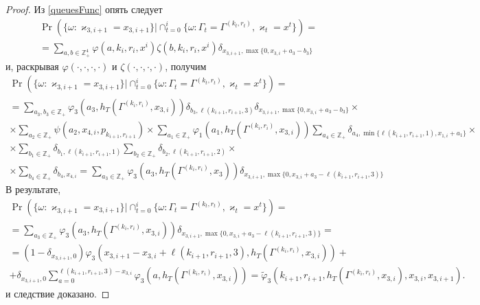 \documentclass[a4paper,12pt,russian]{extarticle}
\begin{document}
\begin{proof}
Из \eqref{queuesFunc} опять следует
\begin{multline*}
\Pr (\{ \omega \colon \varkappa_{3,i+1} = x_{3,i+1}\} |\cap_{t=0}^{i}\{\omega\colon \Gamma_t=\Gamma^{(k_t,r_t)}, \varkappa_t=x^t\})=\\
= \sum_{a,b\in \mathbb{Z}_+^4} \varphi(a,k_i,r_i,x^i)\zeta(b,k_i,r_i,x^i)  \delta_{x_{3,i+1},\max\{0,x_{3,i}+a_3-b_3\}} 
\end{multline*}
и, раскрывая $\varphi(\cdot, \cdot, \cdot, \cdot)$ и $\zeta(\cdot, \cdot, \cdot, \cdot)$, получим
\begin{multline*}
\Pr (\{ \omega \colon \varkappa_{3,i+1} = x_{3,i+1}\} |\cap_{t=0}^{i}\{\omega\colon \Gamma_t=\Gamma^{(k_t,r_t)}, \varkappa_t=x^t\})=\\= \sum_{a_3,b_3\in \mathbb{Z}_+} \varphi_3(a_3,h_T(\Gamma^{(k_i,r_i)},x_{3,i})) \delta_{b_3,\ell(k_{i+1},r_{i+1},3)} \delta_{x_{3,i+1},\max\{0,x_{3,i}+a_3-b_3\}} \times \\
\times
\sum_{a_2\in \mathbb{Z}_+} \psi(a_2,x_{4,i}, p_{k_{i+1},r_{i+1}}) 
\times \sum_{a_1\in \mathbb{Z}_+}  \varphi_1(a_1,h_T(\Gamma^{(k_i,r_i)},x_{3,i})) \sum_{a_4\in \mathbb{Z}_+} \delta_{a_4,\min{\{\ell(k_{i+1},r_{i+1},1), x_{1,i}+a_1}\}} \times \\ \times  \sum_{b_1\in \mathbb{Z}_+}  \delta_{b_1,\ell(k_{i+1},r_{i+1},1)} 
\sum_{b_2\in \mathbb{Z}_+}  \delta_{b_2,\ell(k_{i+1},r_{i+1},2)} \times \\
\times  \sum_{b_4\in \mathbb{Z}_+}\delta_{b_4,x_{4,i}} =  \sum_{a_3\in \mathbb{Z}_+} \varphi_3(a_3,h_T(\Gamma^{(k_i,r_i)},x_3))  \delta_{x_{3,i+1},\max\{0,x_{3,i}+a_3-\ell(k_{i+1},r_{i+1},3)\}} 
\end{multline*}
В результате,
\begin{multline*}
\Pr (\{ \omega \colon \varkappa_{3,i+1} = x_{3,i+1}\} |\cap_{t=0}^{i}\{\omega\colon \Gamma_t=\Gamma^{(k_t,r_t)}, \varkappa_t=x^t\})=\\
=\sum_{a_3\in \mathbb{Z}_+} \varphi_3(a_3,h_T(\Gamma^{(k_i,r_i)},x_{3,i}))  \delta_{x_{3,i+1},\max\{0,x_{3,i}+a_3-\ell(k_{i+1},r_{i+1},3)\}}  = \\
=(1 - \delta_{x_{3,i+1},0})\varphi_3(x_{3,i+1}-x_{3,i} + \ell(k_{i+1},r_{i+1},3),h_T(\Gamma^{(k_i,r_i)},x_{3,i})) + \\
+\delta_{x_{3,i+1},0}\sum_{a=0}^{\ell(k_{i+1},r_{i+1},3)-x_{3,i}} \varphi_3(a,h_T(\Gamma^{(k_i,r_i)},x_{3,i})) 
=\widetilde{\varphi}_3(k_{i+1},r_{i+1},h_T(\Gamma^{(k_i,r_i)},x_{3,i}),x_{3,i},x_{3,i+1}).
\end{multline*}
и следствие доказано.
\end{proof}
\end{document}
